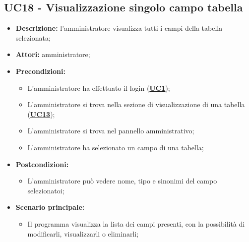 \subsection{UC18 - Visualizzazione singolo campo tabella}
\label{sec:UC18}
\begin{itemize}
	\item \textbf{Descrizione:} l’amministratore visualizza tutti i campi della tabella selezionata;
	\item \textbf{Attori:} amministratore;
	\item \textbf{Precondizioni:} 
	\begin{itemize}
		\item L’amministratore ha effettuato il login (\hyperref[sec:UC1]{\textbf{UC1}});
		\item L’amministratore si trova nella sezione di visualizzazione di una tabella (\hyperref[sec:UC13]{\textbf{UC13}});
		\item L’amministratore si trova nel pannello amministrativo;
		\item L'amministratore ha selezionato un campo di una tabella;
	\end{itemize}
	\item \textbf{Postcondizioni:} 
	\begin{itemize}
		\item L'amministratore può vedere nome, tipo e sinonimi del campo selezionatoi;
	\end{itemize}
	\item \textbf{Scenario principale:} 
	\begin{itemize}
		\item Il programma visualizza la lista dei campi presenti, con la possibilità di modificarli, visualizzarli o eliminarli;
	\end{itemize}
\end{itemize}

